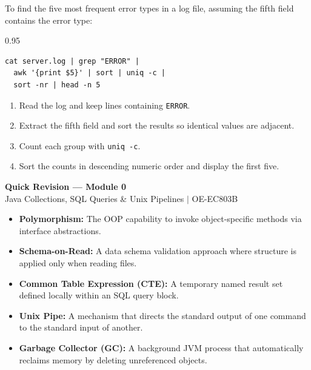 \documentclass[12pt,a4paper]{article}
\begin{document}
\begin{tcolorbox}[examplebox, title={Common UNIX Text Processing Pipeline}]
To find the five most frequent error types in a log file, assuming the fifth field contains the error type:
\begin{spacing}{0.95}
\begin{verbatim}
cat server.log | grep "ERROR" |
  awk '{print $5}' | sort | uniq -c |
  sort -nr | head -n 5
\end{verbatim}
\end{spacing}
\begin{enumerate}[leftmargin=*, itemsep=2pt, topsep=3pt]
  \item Read the log and keep lines containing \texttt{ERROR}.
  \item Extract the fifth field and sort the results so identical values are adjacent.
  \item Count each group with \texttt{uniq -c}.
  \item Sort the counts in descending numeric order and display the first five.
\end{enumerate}
\end{tcolorbox}

\newpage

\begin{center}
  {\large\bfseries\color{myred} Quick Revision --- Module 0}\\[3pt]
  {\small\color{mydark} Java Collections, SQL Queries \& Unix Pipelines $|$ OE-EC803B}
\end{center}
\noindent{\color{myred}\rule{\linewidth}{1.2pt}}
\vspace{8pt}

\begin{tcolorbox}[defbox, title={\textbf{One-Line Definitions}}]
\begin{itemize}[leftmargin=*, itemsep=3pt, topsep=0pt]
  \item \textbf{Polymorphism:} The OOP capability to invoke object-specific methods via interface abstractions.
  \item \textbf{Schema-on-Read:} A data schema validation approach where structure is applied only when reading files.
  \item \textbf{Common Table Expression (CTE):} A temporary named result set defined locally within an SQL query block.
  \item \textbf{Unix Pipe:} A mechanism that directs the standard output of one command to the standard input of another.
  \item \textbf{Garbage Collector (GC):} A background JVM process that automatically reclaims memory by deleting unreferenced objects.
\end{itemize}
\end{tcolorbox}
\end{document}
